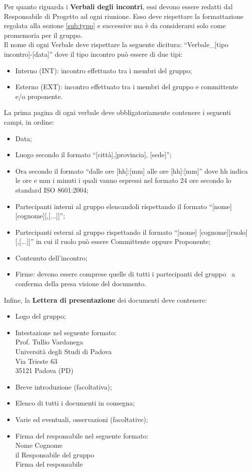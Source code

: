 {{\begin{itemize}
		\end{itemize}
		Per quanto riguarda i \textbf{Verbali degli incontri}, essi devono essere redatti dal Responsabile di Progetto ad ogni riunione. Esso deve rispettare la formattazione regolata alla sezione \ref{sub:typo} e successive ma \`{e} da considerarsi solo come promemoria per il gruppo.\\
		Il nome di ogni Verbale deve rispettare la seguente dicitura: “Verbale\_[tipo incontro]-[data]” dove il tipo incontro pu\`{o} essere di due tipi:
		\begin{itemize}
			\item Interno (INT): incontro effettuato tra i membri del gruppo;
			\item Esterno (EXT): incontro effettuato tra i membri del gruppo e committente e/o proponente.
		\end{itemize}
		La prima pagina di ogni verbale deve obbligatoriamente contenere i seguenti campi, in ordine:
		\begin{itemize}
			\item Data;
			\item Luogo secondo il formato “[citt\`{a}],[provincia], [sede]”;
			\item Ora secondo il formato “dalle ore [hh]:[mm] alle ore [hh]:[mm]” dove hh indica le ore e mm i minuti i quali vanno espressi nel formato 24 ore secondo lo standard ISO 8601:2004;
			\item Partecipanti interni al gruppo elencandoli rispettando il formato “[nome] [cognome][,[...]]”;
			\item Partecipanti esterni al gruppo rispettando il formato “[nome] [cognome][ruolo][,[...]]” in cui il ruolo pu\`{o} essere Committente oppure Proponente;
			\item Contenuto dell'incontro;
			\item Firme: devono essere comprese quelle di tutti i partecipanti del gruppo \gruppo\ a conferma della presa visione del documento.
		\end{itemize}
		Infine, la \textbf{Lettera di presentazione} dei documenti deve contenere:
		\begin{itemize}
			\item Logo del gruppo;
			\item Intestazione nel seguente formato:\\
					Prof. Tullio Vardanega\\
					Università degli Studi di Padova\\
					Via Trieste 63\\
					35121 Padova (PD)
			\item Breve introduzione (facoltativa);
			\item Elenco di tutti i documenti in consegna;
			\item Varie ed eventuali, osservazioni (facoltative);
			\item Firma del responsabile nel seguente formato:\\
					{Nome} {Cognome}\\
					il Responsabile del gruppo \gruppo \\
					{Firma del responsabile}
		\end{itemize}		
	}
}
